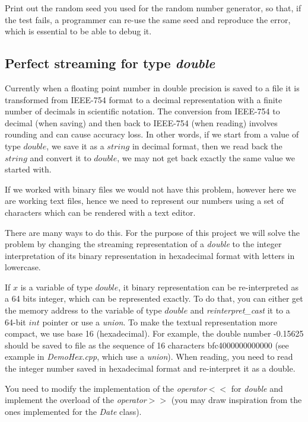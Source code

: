 \documentclass[10pt]{article}
\begin{document}
Print out the random seed you used for the random number generator, so that, if the test fails, a programmer can re-use the same seed and reproduce the error, which is essential to be able to debug it.

\subsection{Perfect streaming for type \textit{double}}
Currently when a floating point number in double precision is saved to a file it is transformed from IEEE-754 format to a decimal representation with a finite number of decimals in scientific notation. The conversion from IEEE-754 to decimal (when saving) and then back to IEEE-754 (when reading) involves rounding and can cause accuracy loss. In other words, if we start from a value of type $double$, we save it as a $string$ in decimal format, then we read back the $string$ and convert it to $double$, we may not get back exactly the same value we started with.

If we worked with binary files we would not have this problem, however here we are working text files, hence we need to represent our numbers using a set of characters which can be rendered with a text editor. 

There are many ways to do this. For the purpose of this project we will solve the problem by changing the streaming representation of a \textit{double} to the integer interpretation of its binary representation in hexadecimal format with letters in lowercase.

If $x$ is a variable of type $double$, it binary representation can be re-interpreted as a 64 bits integer, which can be represented exactly. To do that,
you can either get the memory address to the variable of type $double$ and \textit{reinterpret\_cast} it to a 64-bit $int$ pointer or use a \textit{union}. To make the textual representation more compact, we use base 16 (hexadecimal). For example, the double number -0.15625 should be saved to file as the sequence of 16 characters bfc4000000000000 (see example in \textit{DemoHex.cpp}, which use a \textit{union}). When reading, you need to read the integer number saved in hexadecimal format and re-interpret it as a double.

You need to modify the implementation of the \textit{operator$<<$} for \textit{double} and implement the overload of the \textit{operator$>>$} (you may draw inspiration from the ones implemented for the \textit{Date} class).
\end{document}
